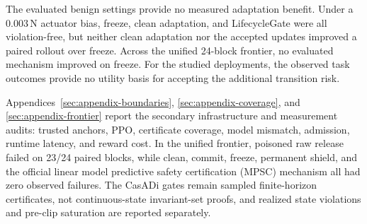 The evaluated benign settings provide no measured adaptation benefit.  Under a
$0.003$\,N actuator bias, freeze, clean
adaptation, and LifecycleGate were all violation-free, but neither clean
adaptation nor the accepted updates improved a paired rollout over freeze.
Across the unified 24-block frontier, no evaluated mechanism improved on
freeze.  For the studied deployments, the observed task outcomes provide no
utility basis for accepting the additional transition risk.

Appendices~\ref{sec:appendix-boundaries}, \ref{sec:appendix-coverage}, and
\ref{sec:appendix-frontier} report the secondary infrastructure and
measurement audits: trusted anchors, PPO, certificate coverage, model mismatch,
admission, runtime latency, and reward cost.  In the unified frontier, poisoned
raw release failed on 23/24 paired blocks, while clean, commit, freeze,
permanent shield, and the official linear model predictive safety certification
(MPSC) mechanism all had zero observed failures.  The CasADi gates remain
sampled finite-horizon certificates, not continuous-state invariant-set proofs,
and realized state violations and pre-clip saturation are reported separately.
